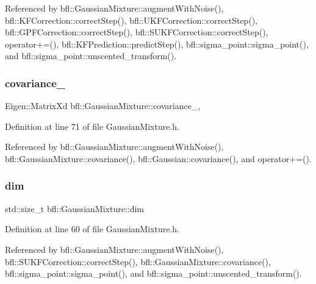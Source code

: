 Referenced by bfl\+::\+Gaussian\+Mixture\+::augment\+With\+Noise(), bfl\+::\+K\+F\+Correction\+::correct\+Step(), bfl\+::\+U\+K\+F\+Correction\+::correct\+Step(), bfl\+::\+G\+P\+F\+Correction\+::correct\+Step(), bfl\+::\+S\+U\+K\+F\+Correction\+::correct\+Step(), operator+=(), bfl\+::\+K\+F\+Prediction\+::predict\+Step(), bfl\+::sigma\+\_\+point\+::sigma\+\_\+point(), and bfl\+::sigma\+\_\+point\+::unscented\+\_\+transform().

\mbox{\label{classbfl_1_1GaussianMixture_aab086cc1a89a8b7efd15303853e52920}} 
\subsubsection{\texorpdfstring{covariance\+\_\+}{covariance\_}}
{\footnotesize\ttfamily Eigen\+::\+Matrix\+Xd bfl\+::\+Gaussian\+Mixture\+::covariance\+\_\+\hspace{0.3cm}{\ttfamily [protected]}, {\ttfamily [inherited]}}



Definition at line 71 of file Gaussian\+Mixture.\+h.



Referenced by bfl\+::\+Gaussian\+Mixture\+::augment\+With\+Noise(), bfl\+::\+Gaussian\+Mixture\+::covariance(), bfl\+::\+Gaussian\+::covariance(), and operator+=().

\mbox{\label{classbfl_1_1GaussianMixture_a3f2b18801e72fa3bf0d6edc778662a8d}} 
\subsubsection{\texorpdfstring{dim}{dim}}
{\footnotesize\ttfamily std\+::size\+\_\+t bfl\+::\+Gaussian\+Mixture\+::dim\hspace{0.3cm}{\ttfamily [inherited]}}



Definition at line 60 of file Gaussian\+Mixture.\+h.



Referenced by bfl\+::\+Gaussian\+Mixture\+::augment\+With\+Noise(), bfl\+::\+S\+U\+K\+F\+Correction\+::correct\+Step(), bfl\+::\+Gaussian\+Mixture\+::covariance(), bfl\+::sigma\+\_\+point\+::sigma\+\_\+point(), and bfl\+::sigma\+\_\+point\+::unscented\+\_\+transform().

